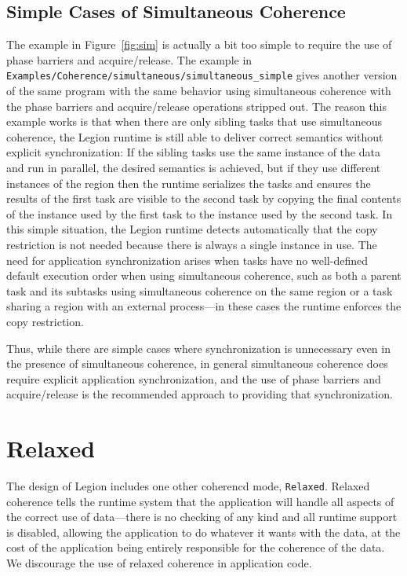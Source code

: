 \subsection{Simple Cases of Simultaneous Coherence}

The example in Figure~\ref{fig:sim} is actually a bit too simple to require the use of phase barriers and acquire/release.  The example in \\ {\tt Examples/Coherence/simultaneous/simultaneous\_simple} gives another version of the same program with the same behavior using simultaneous coherence with the phase barriers and acquire/release operations stripped out.  The reason this example works is that when there are only sibling tasks that use simultaneous coherence, the Legion runtime is still able to deliver correct semantics without explicit synchronization:  If the sibling tasks use the same instance of the data and run in parallel, the desired semantics is achieved, but if they use different instances of the region then the runtime serializes the tasks and ensures the results of the first task are visible to the second task by copying the final contents of the instance used by the first task to the instance used by the second task.  In this simple situation, the Legion runtime detects automatically that the copy restriction is not needed because there is always a single instance in use.  The need for application synchronization arises when tasks have no well-defined default execution order when using simultaneous coherence, such as both a parent task and its subtasks using simultaneous coherence on the same region or a task sharing a region with an external process---in these cases the runtime enforces the copy restriction.

Thus, while there are simple cases where synchronization is unnecessary even in the presence of simultaneous coherence, in general simultaneous coherence does require explicit application synchronization, and the use of phase barriers and acquire/release is the recommended approach to providing that synchronization.

\section{Relaxed}
\label{sec:relaxed}

The design of Legion includes one other coherencd mode, {\tt Relaxed}.
Relaxed coherence tells the runtime system that the application will
handle all aspects of the correct use of data---there is no checking
of any kind and all runtime support is disabled, allowing the
application to do whatever it wants with the data, at the cost of the
application being entirely responsible for the coherence of the data.
We discourage the use of relaxed coherence in application code.


